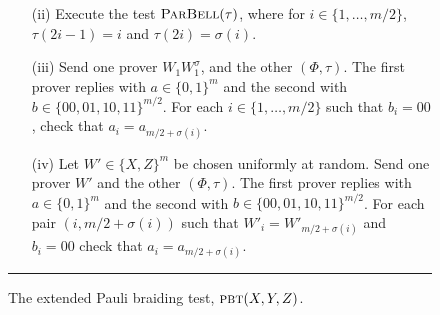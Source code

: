 \begin{figure}[H]
\begin{itemize}
\begin{enumerate}
\begin{enumerate}
\item[(ii)] Execute the test $\textsc{ParBell}(\tau)$, where for $i\in \{1,\ldots,m/2\}$, $\tau(2i-1)=i$ and $\tau(2i)=\sigma(i)$.
\item[(iii)] Send one prover $W_1  W_1^\sigma$, and the other $(\Phi,\tau)$. 
    The first prover replies with $a\in\{0, 1 \}^m$ and the second with $b\in \{00,01,10,11\}^{m/2}$. For each
    $i\in\{1,\ldots,m/2\}$ such that $b_i = 00$, check that $a_i  = a_{m/2+\sigma(i)}$. 
		\item[(iv)] Let $W'\in\{X,Z\}^m$ be chosen uniformly at random. Send one prover $W'$ and the other $(\Phi,\tau)$. The first prover replies  with $a\in\{0, 1 \}^m$ and the second with $b\in \{00,01,10,11\}^{m/2}$. For each pair $(i,m/2+\sigma(i))$ such that $W'_i=W'_{m/2+\sigma(i)}$ and $b_i=00$ check that $a_i=a_{m/2+\sigma(i)}$. 
\end{enumerate}
\end{enumerate}
\end{itemize}
\rule[2ex]{\textwidth}{0.5pt}\vspace{-.5cm}
\caption{The extended Pauli braiding test, $\textsc{pbt}(X,Y,Z)$.}
\label{fig:e-pbt}
\end{figure}




